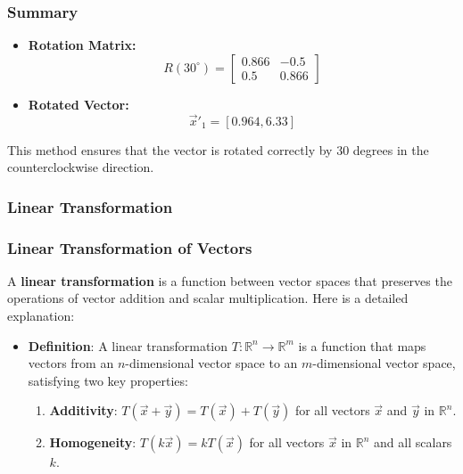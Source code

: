 \documentclass[11pt]{article}
\providecommand{\tightlist}{%
      \setlength{\itemsep}{0pt}\setlength{\parskip}{0pt}}
\begin{document}
\hypertarget{summary}{%
\subsubsection{Summary}\label{summary}}

\begin{itemize}
\tightlist
\item
  \textbf{Rotation Matrix:} \[
  R(30^\circ) = \begin{bmatrix}
  0.866 & -0.5 \\
  0.5 & 0.866
  \end{bmatrix}
  \]
\item
  \textbf{Rotated Vector:} \[
  \vec{x}'_1 = [0.964, 6.33]
  \]
\end{itemize}

This method ensures that the vector is rotated correctly by 30 degrees
in the counterclockwise direction.

    \hypertarget{linear-transformation}{%
\subsubsection{\texorpdfstring{\textbf{Linear
Transformation}}{Linear Transformation}}\label{linear-transformation}}

    \hypertarget{linear-transformation-of-vectors}{%
\subsubsection{Linear Transformation of
Vectors}\label{linear-transformation-of-vectors}}

A \textbf{linear transformation} is a function between vector spaces
that preserves the operations of vector addition and scalar
multiplication. Here is a detailed explanation:

\begin{itemize}
\tightlist
\item
  \textbf{Definition}: A linear transformation
  \(T: \mathbb{R}^n \to \mathbb{R}^m\) is a function that maps vectors
  from an \(n\)-dimensional vector space to an \(m\)-dimensional vector
  space, satisfying two key properties:

  \begin{enumerate}
  \def\labelenumi{\arabic{enumi}.}
  \tightlist
  \item
    \textbf{Additivity}:
    \(T(\vec{x} + \vec{y}) = T(\vec{x}) + T(\vec{y})\) for all vectors
    \(\vec{x}\) and \(\vec{y}\) in \(\mathbb{R}^n\).
  \item
    \textbf{Homogeneity}: \(T(k\vec{x}) = kT(\vec{x})\) for all vectors
    \(\vec{x}\) in \(\mathbb{R}^n\) and all scalars \(k\).
  \end{enumerate}
\end{itemize}
\end{document}
